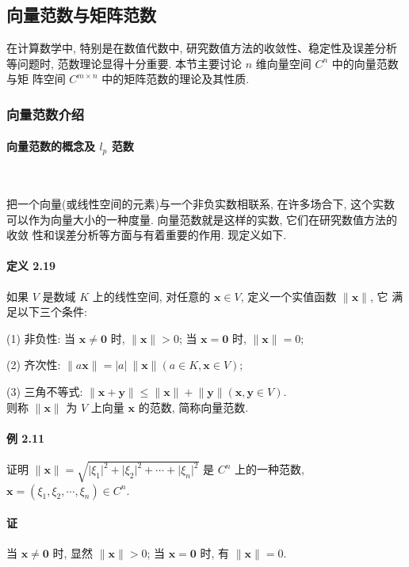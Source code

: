 \subsection{向量范数与矩阵范数}

在计算数学中, 特别是在数值代数中, 研究数值方法的收敛性、稳定性及误差分析
等问题时, 范数理论显得十分重要. 本节主要讨论 $n$ 维向量空间 $C^n$ 中的向量范数与矩
阵空间 $C^{m\times n}$ 中的矩阵范数的理论及其性质.

\subsubsection{向量范数介绍}

\paragraph[]{向量范数的概念及 $l_p$ 范数} \

把一个向量(或线性空间的元素)与一个非负实数相联系, 在许多场合下, 这个实数
可以作为向量大小的一种度量. 向量范数就是这样的实数, 它们在研究数值方法的收敛
性和误差分析等方面与有着重要的作用. 现定义如下.

\paragraph*{定义 2.19} 如果 $V$ 是数域 $K$ 上的线性空间, 对任意的 $\bm{x} \in V$, 定义一个实值函数 $\lVert \bm{x} \rVert$, 它
满足以下三个条件:
\par (1) 非负性: 当 $\bm{x} \neq \bm{0}$ 时, $\lVert \bm{x} \rVert > 0$; 当 $\bm{x} = \bm{0}$ 时, $\lVert \bm{x} \rVert = 0$;
\par (2) 齐次性: $\lVert a\bm{x} \rVert = \lvert a \rvert \ \lVert \bm{x} \rVert (a \in K, \bm{x} \in V)$;
\par (3) 三角不等式: $\lVert \bm{x} + \bm{y} \rVert \leqslant \lVert \bm{x} \rVert + \lVert \bm{y} \rVert (\bm{x}, \bm{y} \in V)$.
\\ 则称 $\lVert \bm{x} \rVert$ 为 $V$ 上向量 $\bm{x}$ 的范数, 简称向量范数.

\paragraph*{例 2.11} 证明 $\lVert \bm{x} \rVert = \sqrt{\lvert \xi_1 \rvert^2 + \lvert \xi_2 \rvert^2 + \cdots + \lvert \xi_n \rvert^2}$ 是 $C^n$ 上的一种范数, $\bm{x} = (\xi_1, \xi_2, \cdots, \xi_n) \in C^n$.

\paragraph*{证} 当 $\bm{x} \neq \bm{0}$ 时, 显然 $\lVert \bm{x} \rVert > 0$; 当 $\bm{x} = \bm{0}$ 时, 有 $\lVert \bm{x} \rVert = 0$.

